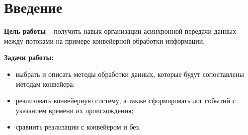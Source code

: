 \chapter*{Введение}
\textbf{Цель работы} – получить навык организации асинхронной передачи данных между потоками на примере конвейерной обработки информации.

\textbf{Задачи работы:}
\begin{itemize}
	\item выбрать и описать методы обработки данных, которые будут сопоставлены методам конвейера;
	\item реализовать конвейерную систему, а также сформировать лог событий с указанием времени их происхождения;
	\item сравнить реализации с конвейером и без.
\end{itemize}